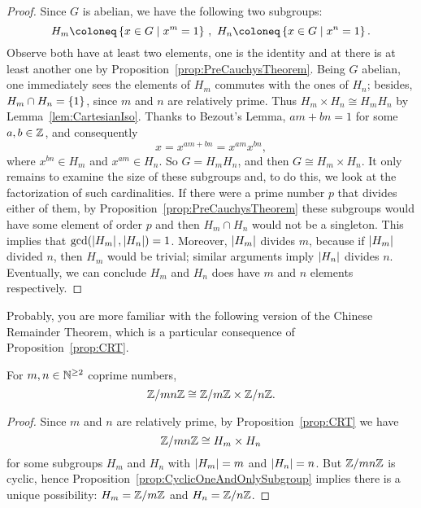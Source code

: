 \begin{proof}
Since \(G\) is abelian, we have the following two subgroups:
\[H_m \coloneq \set{x \in G \mid x^m = 1}\,, \ H_n \coloneq \set{x \in G \mid x^n = 1} .\]
Observe both have at least two elements, one is the identity and at there is at least another one by Proposition~\ref{prop:PreCauchysTheorem}.\newline
Being \(G\) abelian, one immediately sees the elements of \(H_m\) commutes with the ones of \(H_n\); besides, \(H_m \cap H_n = \left\{1\right\}\), since \(m\) and \(n\) are relatively prime. Thus \(H_m \times H_n \cong H_m H_n\) by Lemma~\ref{lem:CartesianIso}. Thanks to Bezout's Lemma, \(am+bn = 1\) for some \(a, b \in \mathbb Z\), and consequently
\[x = x^{am+bn} = x^{am} x^{bn} ,\]
where \(x^{bn} \in H_m\) and \(x^{am} \in H_n\). So \(G = H_m H_n\), and then \(G \cong H_m \times H_n\).\newline
It only remains to examine the size of these subgroups and, to do this, we look at the factorization of such cardinalities. If there were a prime number \(p\) that divides either of them, by Proposition~\ref{prop:PreCauchysTheorem} these subgroups would have some element of order \(p\) and then \(H_m \cap H_n\) would not be a singleton. This implies that \(\gcd(\left\lvert H_m\right\rvert, \left\lvert H_n\right\rvert) = 1\). Moreover, \(\left\lvert H_m\right\rvert\) divides \(m\), because if \(\left\lvert H_m\right\rvert\) divided \(n\), then \(H_m\) would be trivial; similar arguments imply \(\left\lvert H_n\right\rvert\) divides \(n\). Eventually, we can conclude \(H_m\) and \(H_n\) does have \(m\) and \(n\) elements respectively.
\end{proof}

Probably, you are more familiar with the following version of the Chinese Remainder Theorem, which is a particular consequence of Proposition~\ref{prop:CRT}.

\begin{corollary}
For \(m, n \in \mathbb N^{\ge 2}\) coprime numbers,
\[\mathbb Z/mn\mathbb Z \cong \mathbb Z/m\mathbb Z \times \mathbb Z/n\mathbb Z .\]
\end{corollary}

\begin{proof}
Since \(m\) and \(n\) are relatively prime, by Proposition~\ref{prop:CRT} we have
\[\mathbb Z/mn\mathbb Z \cong H_m \times H_n\]
for some subgroups \(H_m\) and \(H_n\) with \(\left\lvert H_m\right\rvert = m\) and \(\left\lvert H_n\right\rvert = n\). But \(\mathbb Z/mn\mathbb Z\) is cyclic, hence Proposition~\ref{prop:CyclicOneAndOnlySubgroup} implies there is a unique possibility: \(H_m = \mathbb Z/m\mathbb Z\) and \(H_n = \mathbb Z/n\mathbb Z\).
\end{proof}

